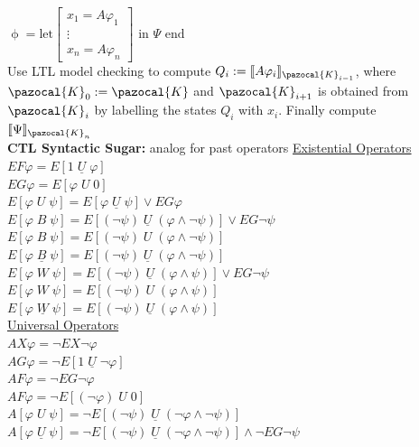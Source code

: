 \documentclass{article}
\newcommand{\Kb}{\pazocal{K}}
\begin{document}
\begin{multicols}{4}
$\upphi = \text{let} \begin{bmatrix}
x_1 = A\varphi_1\\
\vdots \\
x_n = A\varphi_n
\end{bmatrix}
\text{ in } \Psi \text{ end}$\\
Use LTL model checking to compute $Q_i:=\llbracket A\varphi_i\rrbracket _{\Kb_{i-1}}$, where $\Kb_0 := \Kb$ and $\Kb_{i+1}$ is obtained from $\Kb_i$ by labelling the states $Q_i$ with $x_i$.
Finally compute $\llbracket \Psi \rrbracket_{\Kb_n}$\\
\vfill
\columnbreak
\textbf{CTL Syntactic Sugar:} analog for past operators
\underline{Existential Operators}\\
$EF\varphi =  E[1 \; \underline{U} \; \varphi]  $ \\
$EG\varphi =  E[\varphi \; U \; 0]  $ \\
$E[ \varphi \; U \; \psi] =  E[\varphi \; \underline{U}\; \psi] \vee EG\varphi  $ \\
$E[ \varphi \; B \; \psi] =  E[(\neg \psi) \; \underline{U}\; (\varphi \wedge \neg \psi)] \vee EG\neg \psi  $ \\
$E[ \varphi \; B \; \psi] =  E[(\neg \psi) \; U\; (\varphi \wedge \neg \psi)] $ \\
$E[ \varphi \; \underline{B} \; \psi] =  E[(\neg \psi) \; \underline{U}\; (\varphi \wedge \neg \psi)] $ \\
$E[ \varphi \; W \; \psi] =  E[(\neg \psi) \; \underline{U}\; (\varphi \wedge \psi)] \vee EG\neg \psi  $ \\
$E[ \varphi \; W \; \psi] =  E[(\neg \psi) \; U\; (\varphi \wedge \psi)] $ \\
$E[ \varphi \; \underline{W} \; \psi] =  E[(\neg \psi) \; \underline{U}\; (\varphi \wedge \psi)] $ \\
\underline{Universal Operators} \\
$AX\varphi =  \neg EX \neg \varphi \qquad$ \\
$AG\varphi=  \neg E[1 \; \underline{U} \; \neg \varphi] $ \\
$AF\varphi =  \neg EG \neg \varphi $ \\
$AF\varphi =  \neg E[(\neg \varphi)\; U\; 0] $ \\
$A[\varphi \; U\; \psi]=  \neg E[(\neg \psi)\; \underline{U} \; (\neg \varphi \wedge \neg \psi)] $ \\
$A[\varphi \; \underline{U} \; \psi] =  \neg E[(\neg \psi) \; \underline{U}\; (\neg \varphi \wedge \neg \psi)]\wedge \neg EG \neg \psi$ \\

\end{multicols}
\end{document}
